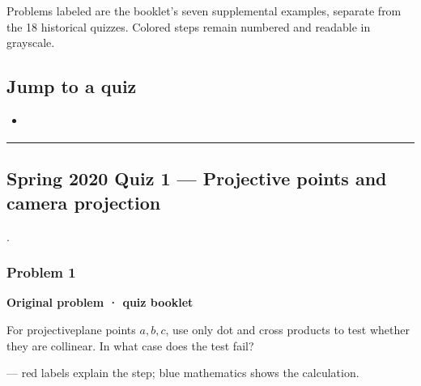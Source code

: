 \documentclass[letterpaper,11pt,english,openany,oneside]{jupyterBook}
\begin{document}
\sphinxAtStartPar
{} Problems labeled  are the booklet’s seven supplemental examples, separate from the 18 historical quizzes. Colored steps remain numbered and readable in grayscale.


\subsection{Jump to a quiz}
\label{\detokenize{lectures/lecture02/quiz-workbook:jump-to-a-quiz}}\begin{itemize}
\item {}
\sphinxAtStartPar
{\hyperref[\detokenize{lectures/lecture02/quiz-workbook:quiz-source-8}]{}}

\end{itemize}


\bigskip\hrule\bigskip



\subsection{Spring 2020 Quiz 1 — Projective points and camera projection}
\label{\detokenize{lectures/lecture02/quiz-workbook:spring-2020-quiz-1-projective-points-and-camera-projection}}\label{\detokenize{lectures/lecture02/quiz-workbook:quiz-source-8}}
\sphinxAtStartPar
{} .


\subsubsection{Problem 1}
\label{\detokenize{lectures/lecture02/quiz-workbook:problem-1}}\label{\detokenize{lectures/lecture02/quiz-workbook:quiz-8-q1}}\label{\detokenize{lectures/lecture02/quiz-workbook:ex-lec02-collinear}}
\par\medskip\textbf{Original problem · quiz booklet}\par\smallskip

\sphinxAtStartPar
For projective\sphinxhyphen{}plane points \(a,b,c\), use only dot and cross products to test whether they are collinear. In what case does the test fail?

\par\medskip

\sphinxAtStartPar
{} — red labels explain the step; blue mathematics shows the calculation.
\end{document}
